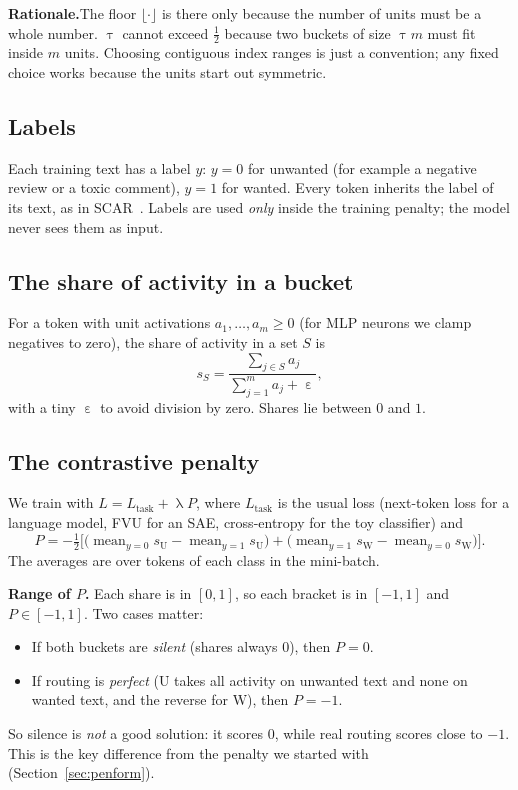 \documentclass[11pt,a4paper]{article}
\theoremstyle{definition}
\newcommand{\Wb}{\mathrm{W}}
\newcommand{\Ub}{\mathrm{U}}
\newcommand{\avg}{\operatorname{mean}}
\newcommand{\why}[1]{\par\smallskip\noindent\textbf{Rationale.}\enspace #1\par}
\begin{document}
\why{The floor $\lfloor\cdot\rfloor$ is there only because the number of units must be a whole
number. $\uptau$ cannot exceed $\frac12$ because two buckets of size $\uptau m$ must fit inside $m$
units. Choosing contiguous index ranges is just a convention; any fixed choice works because the
units start out symmetric.}

\subsection{Labels}
Each training text has a label $y$: $y=0$ for unwanted (for example a negative review or a toxic
comment), $y=1$ for wanted. Every token inherits the label of its text, as in
SCAR~\cite{harle2024scar}. Labels are used \emph{only} inside the training penalty; the model never
sees them as input.

\subsection{The share of activity in a bucket}
For a token with unit activations $a_1,\dots,a_m\ge0$ (for MLP neurons we clamp negatives to zero),
the share of activity in a set $S$ is
\begin{equation}
  s_S=\frac{\sum_{j\in S}a_j}{\sum_{j=1}^{m}a_j+\upepsilon},
\end{equation}
with a tiny $\upepsilon$ to avoid division by zero. Shares lie between $0$ and $1$.

\subsection{The contrastive penalty}
We train with $L=L_{\text{task}}+\uplambda P$, where $L_{\text{task}}$ is the usual loss (next-token
loss for a language model, FVU for an SAE, cross-entropy for the toy classifier) and
\begin{equation}
  \boxed{\;P=-\tfrac12\Big[\big(\avg_{y=0}s_{\Ub}-\avg_{y=1}s_{\Ub}\big)+\big(\avg_{y=1}s_{\Wb}-\avg_{y=0}s_{\Wb}\big)\Big].\;}
  \label{eq:P}
\end{equation}
The averages are over tokens of each class in the mini-batch.


\textbf{Range of $P$.} Each share is in $[0,1]$, so each bracket is in $[-1,1]$ and
$P\in[-1,1]$. Two cases matter:
\begin{itemize}
  \item If both buckets are \emph{silent} (shares always $0$), then $P=0$.
  \item If routing is \emph{perfect} ($\Ub$ takes all activity on unwanted text and none on wanted
  text, and the reverse for $\Wb$), then $P=-1$.
\end{itemize}
So silence is \emph{not} a good solution: it scores $0$, while real routing scores close to $-1$.
This is the key difference from the penalty we started with (Section~\ref{sec:penform}).
\end{document}
